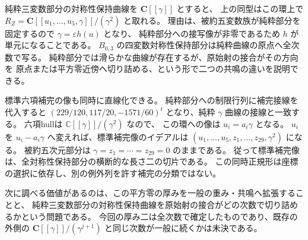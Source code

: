 純粋三変数部分の対称性保持曲線を $\mathbf C[[\gamma]]$ とすると、
上の同型はこの環上で
$R_Z=\mathbf C[[u_1,\ldots,u_5,\gamma]]/(\gamma^2)$ と取れる。
理由は、被約五変数族が純粋部分を固定するので $\gamma=\varepsilon h(u)$ となり、
純粋部分への接写像が非零であるため $h$ が単元になることである。
$B_{0,3}$ の四変数対称性保持部分は純粋曲線の原点へ全次数で写る。
純粋部分では滑らかな曲線が存在するが、原始射の接合がその方向を
原点または平方零近傍へ切り詰める、という形で二つの共鳴の違いを説明できる。

標準六項補完の像も同時に直線化できる。
純粋部分への制限行列に補完接線を代入すると
$(229/120,117/20,-1571/60)^t$ となり、純粋 $\gamma$ 曲線の接線と一致する。
六項hullは $\mathbb C[[\gamma]]/(\gamma^2)$ なので、
この環への像は $u_i=a_i\gamma$ となる。
$u_i$ を $u_i-a_i\gamma$ へ変えれば、標準補完像のイデアルは
$(u_1,\ldots,u_5,z_1,\ldots,z_{29},\gamma^2)$ になる。
被約五次元部分は $\gamma=z_1=\cdots=z_{29}=0$ のままである。
従って標準補完像は、全対称性保持部分の横断的な長さ二の切片である。
この同時正規形は座標の選択に依存し、別の例外列を許す補完の分類ではない。

次に調べる価値があるのは、この平方零の厚みを一般の重み・共鳴へ拡張することと、
純粋三変数部分の対称性保持曲線を原始射の接合がどの次数で切り詰めるかという問題である。
今回の厚み二は全次数で確定したものであり、既存の外側の
$\mathbf C[[\gamma]]/(\gamma^{j+1})$ と同じ次数が一般に続くかは未決である。
